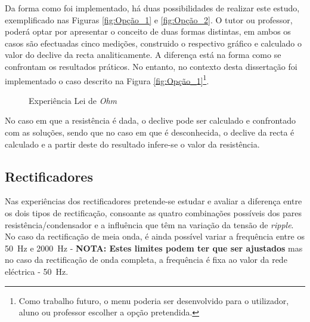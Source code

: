 Da forma como foi implementado, há duas possibilidades de realizar este estudo, exemplificado nas Figuras \ref{fig:Opção_1} e \ref{fig:Opção_2}. O tutor ou professor, poderá optar por apresentar o conceito de duas formas distintas, em ambos os casos são efectuadas cinco medições, construido o respectivo gráfico e calculado o valor do declive da recta analiticamente. A diferença está na forma como se confrontam os resultados práticos. No entanto, no contexto desta dissertação foi  implementado o caso descrito na Figura \ref{fig:Opção_1}\footnote{Como trabalho futuro, o menu poderia ser desenvolvido para o utilizador, aluno ou professor escolher a opção pretendida.}. 

\begin{figure}[hbtp]
	\centering%
		\centering
		\qquad
		\caption{Experiência Lei de \textit{Ohm}}%
		\label{fig:experienciaOHM}%
	\end{figure}

No caso em que a resistência é dada, o declive pode ser calculado e confrontado com as soluções, sendo que no caso em que é desconhecida, o declive da recta é calculado e a partir deste do resultado infere-se o valor da resistência. 

\subsection{Rectificadores}
\label{sec:circuitosrectificadores}
Nas experiências dos rectificadores pretende-se estudar e avaliar a diferença entre os dois tipos de rectificação, consoante as quatro combinações possíveis dos pares resistência/condensador e a influência que têm na variação da tensão de \textit{ripple}. No caso da rectificação de meia onda, é ainda possível variar a frequência entre os \SI{50}{\hertz} e \SI{2000}{\hertz} - \textbf{NOTA: Estes limites podem ter que ser ajustados} mas no caso da rectificação de onda completa, a frequência é fixa ao valor da rede eléctrica - \SI{50}{\hertz}.

